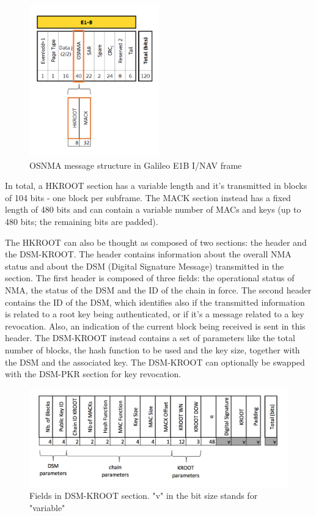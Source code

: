 \begin{figure}[h!]
  \begin{center}
    \includegraphics[width=0.5\textwidth]{figures/osnma_fields.png}
  \end{center}
  \caption{OSNMA message structure in Galileo E1B I/NAV frame}
  \label{fig:osnma_fields}
\end{figure}

In total, a HKROOT section has a variable length and it's transmitted in blocks
of 104 bits - one block per subframe. The MACK section instead has a fixed
length of 480 bits and can contain a variable number of MACs and keys (up to 480
bits; the remaining bits are padded).

The HKROOT can also be thought as composed of two sections: the header and the
DSM-KROOT. The header contains information about the overall NMA status and
about the DSM (Digital Signature Message) transmitted in the section. The first
header is composed of three fields: the operational status of NMA, the status of
the DSM and the ID of the chain in force. The second header contains the ID of
the DSM, which identifies also if the transmitted information is related to a
root key being authenticated, or if it's a message related to a key revocation.
Also, an indication of the current block being received is sent in this header.
The DSM-KROOT instead contains a set of parameters like the total number of
blocks, the hash function to be used and the key size, together with the DSM and
the associated key. The DSM-KROOT can optionally be swapped with the DSM-PKR
section for key revocation.

\begin{figure}[h!]
  \includegraphics[width=\linewidth]{figures/dsm_kroot.png}
  \caption{Fields in DSM-KROOT section. "v" in the bit size stands for "variable"}
  \label{fig:dsm_kroot}
\end{figure}

